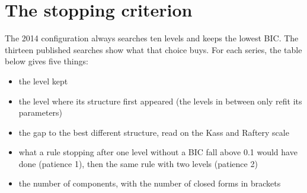\documentclass[
]{article}
\providecommand{\tightlist}{%
  \setlength{\itemsep}{0pt}\setlength{\parskip}{0pt}}
\begin{document}
\section{The stopping criterion}\label{the-stopping-criterion}

The 2014 configuration always searches ten levels and keeps the lowest
BIC. The thirteen published searches show what that choice buys. For
each series, the table below gives five things:

\begin{itemize}
\tightlist
\item
  the level kept
\item
  the level where its structure first appeared (the levels in between
  only refit its parameters)
\item
  the gap to the best different structure, read on the Kass and Raftery
  scale \autocite{kass1995bayes}
\item
  what a rule stopping after one level without a BIC fall above 0.1
  would have done (patience 1), then the same rule with two levels
  (patience 2)
\item
  the number of components, with the number of closed forms in brackets
\end{itemize}
\end{document}
